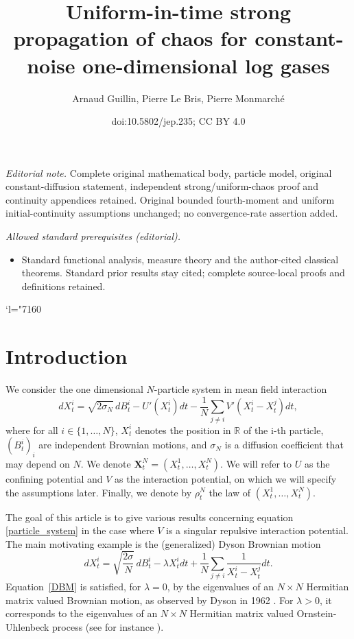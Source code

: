 \documentclass[10pt]{amsart}
\title{Uniform-in-time strong propagation of chaos for constant-noise one-dimensional log gases}
\author{Arnaud Guillin, Pierre Le Bris, Pierre Monmarché}
\date{doi:10.5802/jep.235; CC BY 4.0}
\newcommand{\Changel}{\mathcode`l="7160}
\newcommand{\bX}{{\boldsymbol{X}}}
\theoremstyle{plain}
\theoremstyle{definition}
\begin{document}
\maketitle
\noindent\textit{Editorial note.} Complete original mathematical body, particle model, original constant-diffusion statement, independent strong/uniform-chaos proof and continuity appendices retained. Original bounded fourth-moment and uniform initial-continuity assumptions unchanged; no convergence-rate assertion added.\par\medskip
\noindent\textit{Allowed standard prerequisites (editorial).}\begin{itemize}
\item Standard functional analysis, measure theory and the author-cited classical theorems. Standard prior results stay cited; complete source-local proofs and definitions retained.
\end{itemize}\medskip
\vspace*{-\baselineskip}
\tableofcontents

\Changel

\section{Introduction}

We consider the one dimensional $N$-particle system in mean field interaction\vspace*{-3pt}
\begin{equation}\label{particle_system}
dX^i_t=\sqrt{2\sigma_N}\,dB^i_t-U'\left(X^i_t\right)dt-\frac{1}{N}\sum_{j\neq i}V'(X^i_t-X^j_t)dt,
\end{equation}
where for all $i\in\{1,\dots,N\}$, $X^i_t$ denotes the position in $\mathbb{R}$ of the i-th particle, $(B^i_t)_i$ are independent Brownian motions, and $\sigma_N$ is a diffusion coefficient that may depend on $N$. We denote $\bX^N_t=\left(X^1_t,\dots,X^N_t\right)$. We will refer to $U$ as the confining potential and $V$ as the interaction potential, on which we will specify the assumptions later. Finally, we denote by $\rho^N_t$ the law of $(X^1_t,\dots,X^N_t)$.

The goal of this article is to give various results concerning equation \eqref{particle_system} in the case where $V$ is a singular repulsive interaction potential. The main motivating example is the (generalized) Dyson Brownian motion\vspace*{-3pt}
\begin{equation}\label{DBM}
dX^i_t=\sqrt{\frac{2\sigma}{N}}\,dB^i_t-\lambda X^i_tdt+\frac{1}{N}\sum_{j\neq i}\frac{1}{X^i_t-X^j_t}dt.
\end{equation}
Equation~\eqref{DBM} is satisfied, for $\lambda=0$, by the eigenvalues of an $N\times N$ Hermitian matrix valued Brownian motion, as observed by Dyson in 1962 \cite{Dyson}. For $\lambda>0$, it corresponds to the eigenvalues of an $N\times N$ Hermitian matrix valued Ornstein-Uhlenbeck process (see for instance \cite{Chan92, Rogers_Shi}).
\end{document}
